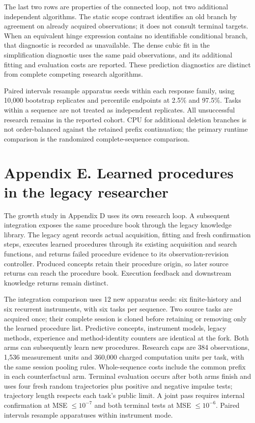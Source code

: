 \documentclass[11pt,a4paper]{article}
\begin{document}
The last two rows are properties of the connected loop, not two additional
independent algorithms. The static scope contrast identifies an old branch by
agreement on already acquired observations; it does not consult terminal targets.
When an equivalent hinge expression contains no identifiable conditional branch,
that diagnostic is recorded as unavailable. The dense cubic fit in the
simplification diagnostic uses the same paid observations, and its additional
fitting and evaluation costs are reported. These prediction diagnostics are
distinct from complete competing research algorithms.


Paired intervals resample apparatus seeds within each response family, using
10,000 bootstrap replicates and percentile endpoints at 2.5\% and 97.5\%. Tasks
within a sequence are not treated as independent replicates. All unsuccessful
research remains in the reported cohort. CPU for additional deletion branches
is not order-balanced against the retained prefix continuation; the primary
runtime comparison is the randomized complete-sequence comparison.


\section*{Appendix E. Learned procedures in the legacy researcher}

The growth study in Appendix D uses its own research loop. A subsequent
integration exposes the same procedure book through the legacy knowledge library.
The legacy agent records actual acquisition, fitting and fresh confirmation
steps, executes learned procedures through its existing acquisition and search
functions, and returns failed procedure evidence to its observation-revision
controller. Produced concepts retain their procedure origin, so later source
returns can reach the procedure book. Execution feedback and downstream knowledge
returns remain distinct.


The integration comparison uses 12 new apparatus seeds: six finite-history and
six recurrent instruments, with six tasks per sequence. Two source tasks are
acquired once; their complete session is cloned before retaining or removing only
the learned procedure list. Predictive concepts, instrument models, legacy
methods, experience and method-identity counters are identical at the fork. Both
arms can subsequently learn new procedures. Research caps are 384 observations,
1,536 measurement units and 360,000 charged computation units per task, with the
same session pooling rules. Whole-sequence costs include the common prefix in
each counterfactual arm. Terminal evaluation occurs after both arms finish and
uses four fresh random trajectories plus positive and negative impulse tests;
trajectory length respects each task's public limit. A joint pass requires
internal confirmation at MSE \(\leq10^{-7}\) and both terminal tests at
MSE \(\leq10^{-6}\). Paired intervals resample apparatuses within instrument mode.
\end{document}

